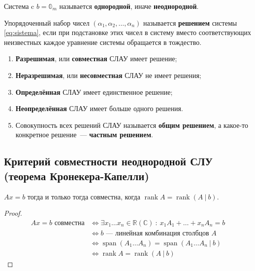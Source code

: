 \documentclass[10pt]{article}
\begin{document}
\begin{definition}
Система c $b = \mathbb{0}_m$ называется \textbf{однородной}, иначе \textbf{неоднородной}.
\end{definition}

\begin{definition}
Упорядоченный набор чисел \((\alpha_1, \alpha_2, \dots, \alpha_n)\) называется \textbf{решением} системы \eqref{eq:sistema}, если при подстановке этих чисел в систему вместо соответствующих неизвестных каждое уравнение системы обращается в тождество.
\end{definition}

\begin{definition} \;
\begin{enumerate}
    \item \textbf{Разрешимая}, или \textbf{совместная} СЛАУ имеет решение;
    \item \textbf{Неразрешимая}, или \textbf{несовместная} СЛАУ не имеет решения;
    \item \textbf{Определённая} СЛАУ имеет единственное решение;
    \item \textbf{Неопределённая} СЛАУ имеет больше одного решения.
    \item Совокупность всех решений СЛАУ называется \textbf{общим решением}, а какое-то конкретное решение~--- \textbf{частным решением}.
\end{enumerate}
\end{definition}

\subsection*{Критерий совместности неоднородной СЛУ (теорема Кронекера-Капелли)}

\begin{theorem}
$Ax = b$ тогда и только тогда совместна, когда $\operatorname{rank} A = \operatorname{rank} (A \: | \: b)$.
\end{theorem}

\begin{proof}
\begin{align*}
    Ax = b\text{ совместна} &\Leftrightarrow \exists x_1 \dots x_n \in \mathbb{R}(\mathbb{C}) \: : \: x_1 A_1 + \dots + x_n A_n = b \\
    &\Leftrightarrow \text{$b$~--- линейная комбинация столбцов $A$} \\
    &\Leftrightarrow \operatorname{span}(A_1 \dots A_n) = \operatorname{span}(A_1 \dots A_n \: | \: b) \\
    &\Leftrightarrow \operatorname{rank} A = \operatorname{rank} (A \: | \: b)
\end{align*}
\end{proof}
\end{document}
